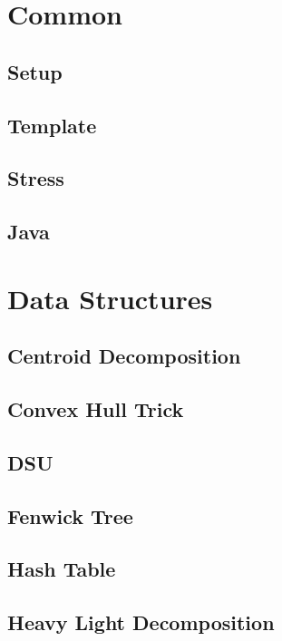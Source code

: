 
\tableofcontents
\clearpage
\twocolumn

\section{Common}

\subsection{Setup}

\subsection{Template}

\subsection{Stress}

\subsection{Java}
 

\section{Data Structures}

\subsection{Centroid Decomposition}

\subsection{Convex Hull Trick}

\subsection{DSU}

\subsection{Fenwick Tree}

\subsection{Hash Table}

\subsection{Heavy Light Decomposition}

